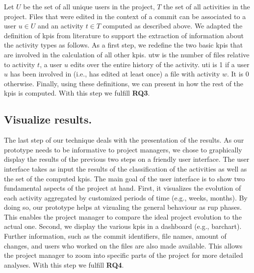 Let $U$ be the set of all unique users in the project, $T$ the set of all activities in the project. Files that were edited in the context of a commit can be associated to a user $u \in U$ and an activity $t \in T$ computed as described above. 
We adapted the definition of \glspl{kpi} from literature to support the extraction of information about the activity types as follows. As a first step, we redefine the two basic \glspl{kpi} that are involved in the calculation of all other \glspl{kpi}. 
\gls{utw} is the number of files relative to activity $t$, a user $u$ edits over the entire history of the activity.
\gls{uti} is 1 if a user $u$ has been involved in (i.e., has edited at least once) a file with activity $w$. It is 0 otherwise. 
Finally, using these definitions, we can present in  how the rest of the \glspl{kpi} is computed. With this step we fulfill \textbf{RQ3}.\\\hfill



\subsection{Visualize results.}
The last step of our technique deals with the presentation of the results. As our prototype needs to be informative to project managers, we chose to graphically display the results of the previous two steps on a friendly user interface. The user interface takes as input the results of the classification of the activities as well as the set of the computed \glspl{kpi}. 
The main goal of the user interface is to show two fundamental aspects of the project at hand. First, it visualizes the evolution of each activity aggregated by customized periods of time (e.g., weeks, months). By doing so, our prototype helps at vizualing the general behaviour as \gls{rup} phases. This enables the project manager to compare the ideal project evolution to the actual one. Second, we display the various \glspl{kpi} in a dashboard (e.g., barchart). Further information, such as the commit identifiers, file names, amount of changes, and users who worked on the files are also made available. This allows the project manager to zoom into specific parts of the project for more detailed analyses. With this step we fulfill \textbf{RQ4}.

